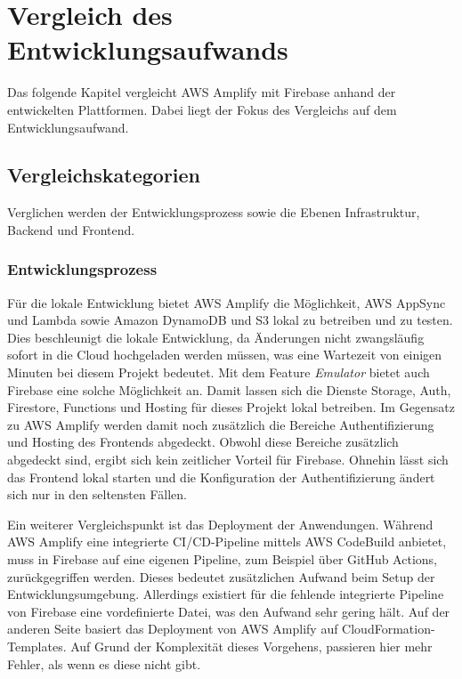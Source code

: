 \chapter{Vergleich des Entwicklungsaufwands}

Das folgende Kapitel vergleicht \ac{AWS} Amplify mit Firebase anhand der entwickelten Plattformen. Dabei liegt der Fokus des Vergleichs auf dem Entwicklungsaufwand.

\section{Vergleichskategorien}

Verglichen werden der Entwicklungsprozess sowie die Ebenen Infrastruktur, Backend und Frontend.

\subsection{Entwicklungsprozess}

Für die lokale Entwicklung bietet \ac{AWS} Amplify die Möglichkeit, \ac{AWS} AppSync und Lambda sowie Amazon DynamoDB und S3 lokal zu betreiben und zu testen. Dies beschleunigt die lokale Entwicklung, da Änderungen nicht zwangsläufig sofort in die Cloud hochgeladen werden müssen, was eine Wartezeit von einigen Minuten bei diesem Projekt bedeutet. Mit dem Feature \textit{Emulator} bietet auch Firebase eine solche Möglichkeit an. Damit lassen sich die Dienste Storage, Auth, Firestore, Functions und Hosting für dieses Projekt lokal betreiben. Im Gegensatz zu \ac{AWS} Amplify werden damit noch zusätzlich die Bereiche Authentifizierung und Hosting des Frontends abgedeckt. Obwohl diese Bereiche zusätzlich abgedeckt sind, ergibt sich kein zeitlicher Vorteil für Firebase. Ohnehin lässt sich das Frontend lokal starten und die Konfiguration der Authentifizierung ändert sich nur in den seltensten Fällen.

Ein weiterer Vergleichspunkt ist das Deployment der Anwendungen. Während \ac{AWS} Amplify eine integrierte CI/CD-Pipeline mittels \ac{AWS} CodeBuild anbietet, muss in Firebase auf eine eigenen Pipeline, zum Beispiel über GitHub Actions, zurückgegriffen werden. Dieses bedeutet zusätzlichen Aufwand beim Setup der Entwicklungsumgebung. Allerdings existiert für die fehlende integrierte Pipeline von Firebase eine vordefinierte Datei, was den Aufwand sehr gering hält. Auf der anderen Seite basiert das Deployment von \ac{AWS} Amplify auf CloudFormation-Templates. Auf Grund der Komplexität dieses Vorgehens, passieren hier mehr Fehler, als wenn es diese nicht gibt.

